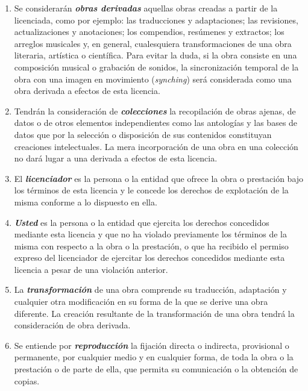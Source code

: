 \begin{enumerate}
          \item Se considerarán \textbf{\emph{obras derivadas}} aquellas obras creadas a partir de la licenciada, como por ejemplo: las traducciones y adaptaciones; las revisiones, actualizaciones y anotaciones; los compendios, resúmenes y extractos; los arreglos musicales y, en general, cualesquiera transformaciones de una obra literaria, artística o científica. Para evitar la duda, si la obra consiste en una composición musical o grabación de sonidos, la sincronización temporal de la obra con una imagen en movimiento (\emph{synching}) será considerada como una obra derivada a efectos de esta licencia.

          \item Tendrán la consideración de \textbf{\emph{colecciones}} la recopilación de obras ajenas, de datos o de otros elementos independientes como las antologías y las bases de datos que por la selección o disposición de sus contenidos constituyan creaciones intelectuales. La mera incorporación de una obra en una colección no dará lugar a una derivada a efectos de esta licencia.

          \item El \textbf{\emph{licenciador}} es la persona o la entidad que ofrece la obra o prestación bajo los términos de esta licencia y le concede los derechos de explotación de la misma conforme a lo dispuesto en ella. 

          \item \textbf{\emph{Usted}} es la persona o la entidad que ejercita los derechos concedidos mediante esta licencia y que no ha violado previamente los términos de la misma con respecto a la obra o la prestación, o que ha recibido el permiso expreso del licenciador de ejercitar los derechos concedidos mediante esta licencia a pesar de una violación anterior.

          \item La \textbf{\emph{transformación}} de una obra comprende su traducción, adaptación y cualquier otra modificación en su forma de la que se derive una obra diferente. La creación resultante de la transformación de una obra tendrá la consideración de obra derivada. 

         \item Se entiende por \textbf{\emph{reproducción}} la fijación directa o indirecta, provisional o permanente, por cualquier medio y en cualquier forma, de toda la obra o la prestación o de parte de ella, que permita su comunicación o la obtención de copias. 


\end{enumerate}
